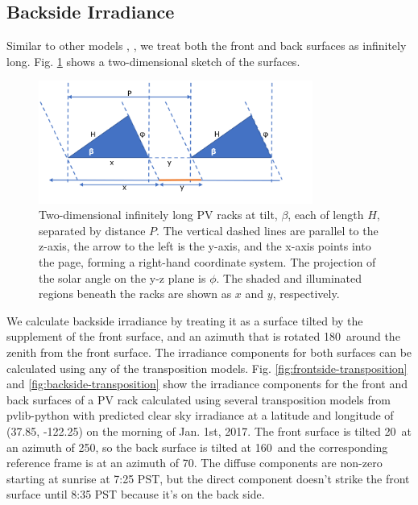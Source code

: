\documentclass[conference]{IEEEtran}
\begin{document}
\subsection{ Backside Irradiance }
Similar to other models \cite{Marion2017}, \cite{Anoma2017}, we treat both the front and back surfaces as infinitely long. Fig. \ref{fig:2d-infinite-sheds} shows a two-dimensional sketch of the surfaces.

\begin{figure}
\centering
\includegraphics[width=9cm]{2d_infinite_sheds.png}
\caption{Two-dimensional infinitely long PV racks at tilt, $\beta$, each of length $H$, separated by distance $P$.  The vertical dashed lines are parallel to the z-axis, the arrow to the left is the y-axis, and the x-axis points into the page, forming a right-hand coordinate system.  The projection of the solar angle on the y-z plane is $\phi$. The shaded and illuminated regions beneath the racks are shown as $x$ and $y$, respectively.}
\label{fig:2d-infinite-sheds}
\end{figure}

We calculate backside irradiance by treating it as a surface tilted by the supplement of the front surface, and an azimuth that is rotated 180\degree\ around the zenith from the front surface.  The irradiance components for both surfaces can be calculated using any of the transposition models.  Fig. \ref{fig:frontside-transposition} and \ref{fig:backside-transposition} show the irradiance components for the front and back surfaces of a PV rack calculated using several transposition models from pvlib-python \cite{Holmgren2018} with predicted clear sky irradiance at a latitude and longitude of (37.85\degree, -122.25\degree) on the morning of Jan. 1st, 2017.  The front surface is tilted 20\degree\ at an azimuth of 250\degree, so the back surface is tilted at 160\degree\ and the corresponding reference frame is at an azimuth of 70\degree.  The diffuse components are non-zero starting at sunrise at 7:25 PST, but the direct component doesn’t strike the front surface until 8:35 PST because it’s on the back side.
\end{document}
